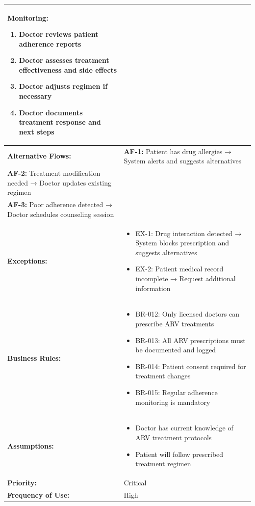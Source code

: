 \documentclass[12pt,a4paper]{article}
\begin{document}
\begin{longtable}{|p{4.5cm}|p{10.5cm}|}
\begin{enumerate}
\end{enumerate}
\textbf{Monitoring:}
\begin{enumerate}
  \item Doctor reviews patient adherence reports
  \item Doctor assesses treatment effectiveness and side effects
  \item Doctor adjusts regimen if necessary
  \item Doctor documents treatment response and next steps
\end{enumerate} \\
\hline
\textbf{Alternative Flows:} &
\textbf{AF-1:} Patient has drug allergies → System alerts and suggests alternatives \\
\textbf{AF-2:} Treatment modification needed → Doctor updates existing regimen \\
\textbf{AF-3:} Poor adherence detected → Doctor schedules counseling session \\
\hline
\textbf{Exceptions:} &
\begin{itemize}
  \item EX-1: Drug interaction detected → System blocks prescription and suggests alternatives
  \item EX-2: Patient medical record incomplete → Request additional information
\end{itemize} \\
\hline
\textbf{Business Rules:} &
\begin{itemize}
  \item BR-012: Only licensed doctors can prescribe ARV treatments
  \item BR-013: All ARV prescriptions must be documented and logged
  \item BR-014: Patient consent required for treatment changes
  \item BR-015: Regular adherence monitoring is mandatory
\end{itemize} \\
\hline
\textbf{Assumptions:} &
\begin{itemize}
  \item Doctor has current knowledge of ARV treatment protocols
  \item Patient will follow prescribed treatment regimen
\end{itemize} \\
\hline
\textbf{Priority:} & Critical \\
\hline
\textbf{Frequency of Use:} & High \\
\hline
\end{longtable}
\end{document}
